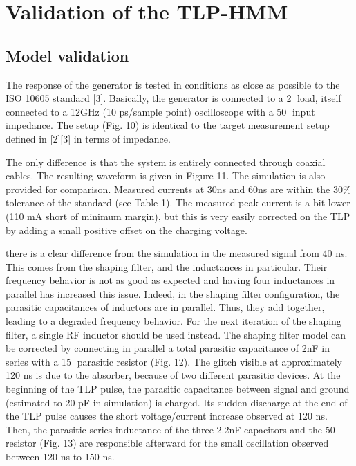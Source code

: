 \section{Validation of the TLP-HMM}

\subsection{Model validation}

The response of the generator is tested in conditions as close as possible to the ISO 10605 standard [3].
Basically, the generator is connected to a 2 load, itself connected to a 12GHz (10 ps/sample point) oscilloscope with a 50 input impedance.
The setup (Fig. 10) is identical to the target measurement setup defined in [2][3] in terms of impedance.


The only difference is that the system is entirely connected through coaxial cables.
The resulting waveform is given in Figure 11. The simulation is also provided for comparison.
Measured currents at 30ns and 60ns are within the 30\% tolerance of the standard (see Table 1).
The measured peak current is a bit lower (110 mA short of minimum margin), but this is very easily corrected on the TLP by adding a small positive offset on the charging voltage.



there is a clear difference from the simulation in the measured signal from 40 ns.
This comes from the shaping filter, and the inductances in particular.
Their frequency behavior is not as good as expected and having four inductances in parallel has increased this issue.
Indeed, in the shaping filter configuration, the parasitic capacitances of inductors are in parallel.
Thus, they add together, leading to a degraded frequency behavior.
For the next iteration of the shaping filter, a single RF inductor should be used instead.
The shaping filter model can be corrected by connecting in parallel a total parasitic capacitance of 2nF in series with a 15 parasitic resistor (Fig. 12).
The glitch visible at approximately 120 ns is due to the absorber, because of two different parasitic devices.
At the beginning of the TLP pulse, the parasitic capacitance between signal and ground (estimated to 20 pF in simulation) is charged.
Its sudden discharge at the end of the TLP pulse causes the short voltage/current increase observed at 120 ns.
Then, the parasitic series inductance of the three 2.2nF capacitors and the 50 resistor (Fig. 13) are responsible afterward for the small oscillation observed between 120 ns to 150 ns.

